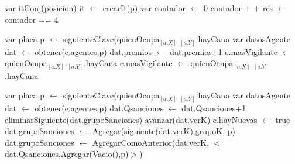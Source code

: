 \begin{algorithm}[H]
\begin{algorithmic}[1]
 
	\State var itConj(posicion) it $\gets$ crearIt(p) 
	\State var contador $\gets$ 0 
		 
		    \State contador $+$ $+$ 
		\EndIf
	\EndWhile
	\State res $\gets$ contador == 4	
\EndFunction
\end{algorithmic}
\end{algorithm}	
	

\begin{algorithmic}[H]
\begin{algorithm}
 
	\State var placa p $\gets$ siguienteClave(quienOcupa$_{[a.X]}$ $_{[a.Y]}$.hayCana 
	\State var datosAgente dat $\gets$ obtener(e.agentes,p) 
	\State dat.premios $\gets$ dat.premios$+$1 
	 
		\State e.masVigilante $\gets$ quienOcupa$_{[a.X]}$ $_{[a.Y]}$.hayCana 
	\Else
		 
			 
				\State e.masVigilante $\gets$ quienOcupa$_{[a.X]}$ $_{[a.Y]}$.hayCana 
			\EndIf
		\EndIf
	\EndIf
\EndFunction
\end{algorithm}
\end{algorithmic}

\begin{algorithmic}[H]
\begin{algorithm}
 
	\State var placa p $\gets$ siguienteClave(quienOcupa$_{[a.X]}$ $_{[a.Y]}$.hayCana 
	\State var datosAgente dat $\gets$ obtener(e.agentes,p) 
	\State dat.Qsanciones $\gets$ dat.Qsanciones$+$1 
	\State eliminarSiguiente(dat.grupoSanciones)  
	\State avanzar(dat.verK)  
	\State e.hayNuevas $\gets$ true  
	 
		\State dat.grupoSanciones $\gets$ Agregar(siguiente(dat.verK).grupoK, p)  
	\Else
		\State dat.grupoSanciones $\gets$ AgregarComoAnterior(dat.verK, $<$dat.Qsanciones,Agregar(Vacio(),p)$>$) 
	\EndIf
\EndFunction
\end{algorithm}
\end{algorithmic}

